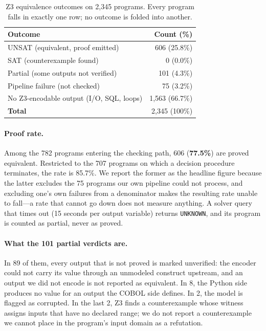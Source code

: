 \documentclass[sigconf,nonacm]{acmart}
\begin{document}
\begin{table}[t]
\centering
\caption{Z3 equivalence outcomes on 2{,}345 programs. Every program falls in exactly one row; no outcome is folded into another.}
\label{tab:rq2}
\small
\begin{tabular}{lr}
\toprule
\textbf{Outcome} & \textbf{Count (\%)} \\
\midrule
UNSAT (equivalent, proof emitted)          & 606 (25.8\%) \\
SAT (counterexample found)                 & 0 (0.0\%) \\
Partial (some outputs not verified)        & 101 (4.3\%) \\
Pipeline failure (not checked)             & 75 (3.2\%) \\
No Z3-encodable output (I/O, SQL, loops)   & 1{,}563 (66.7\%) \\
\midrule
\textbf{Total}                             & 2{,}345 (100\%) \\
\bottomrule
\end{tabular}
\end{table}

\paragraph{Proof rate.} Among the 782 programs entering the checking path, 606 (\textbf{77.5\%}) are proved equivalent. Restricted to the 707 programs on which a decision procedure terminates, the rate is 85.7\%. We report the former as the headline figure because the latter excludes the 75 programs our own pipeline could not process, and excluding one's own failures from a denominator makes the resulting rate unable to fall---a rate that cannot go down does not measure anything. A solver query that times out (15 seconds per output variable) returns \texttt{UNKNOWN}, and its program is counted as partial, never as proved.

\paragraph{What the 101 partial verdicts are.} In 89 of them, every output that is not proved is marked unverified: the encoder could not carry its value through an unmodeled construct upstream, and an output we did not encode is not reported as equivalent. In 8, the Python side produces no value for an output the COBOL side defines. In 2, the model is flagged as corrupted. In the last 2, Z3 finds a counterexample whose witness assigns inputs that have no declared range; we do not report a counterexample we cannot place in the program's input domain as a refutation.
\end{document}
